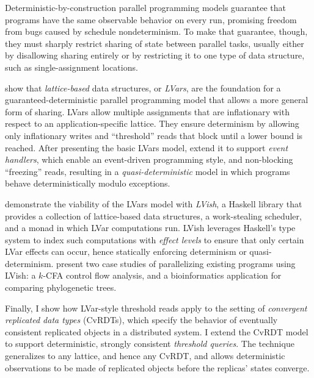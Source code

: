 Deterministic-by-construction parallel programming models guarantee
that programs have the same observable behavior on every run,
promising freedom from bugs caused by schedule nondeterminism.  To
make that guarantee, though, they must sharply restrict sharing of
state between parallel tasks, usually either by disallowing sharing
entirely or by restricting it to one type of data structure, such as
single-assignment locations.

 show that \emph{lattice-based} data structures, or \emph{LVars}, are the
foundation for a guaranteed-deterministic parallel programming model
that allows a more general form of sharing.  LVars allow multiple
assignments that are inflationary with respect to an
application-specific lattice.  They ensure determinism by allowing
only inflationary writes and ``threshold'' reads that block until a
lower bound is reached.  After presenting the basic LVars model, 
extend it to support \emph{event handlers}, which enable an event-driven
programming style, and non-blocking ``freezing'' reads, resulting in a
\emph{quasi-deterministic} model in which programs behave deterministically
modulo exceptions.

 demonstrate the viability of the LVars model with \emph{LVish}, a Haskell
library that provides a collection of lattice-based data structures, a
work-stealing scheduler, and a monad in which LVar computations run.
LVish leverages Haskell's type system to index such computations with
\emph{effect levels} to ensure that only certain LVar effects can occur,
hence statically enforcing determinism or quasi-determinism.  present
two case studies of parallelizing existing programs using LVish: a
$k$-CFA control flow analysis, and a bioinformatics application for
comparing phylogenetic trees.

\ifdefined\DISSERTATION
Finally, I show how LVar-style threshold reads apply to the setting of
\emph{convergent replicated data types} (CvRDTs), which specify the behavior
of eventually consistent replicated objects in a distributed system.
I extend the CvRDT model to support deterministic, strongly consistent
\emph{threshold queries}.  The technique generalizes to any lattice, and
hence any CvRDT, and allows deterministic observations to be made of
replicated objects before the replicas' states converge.
\fi
